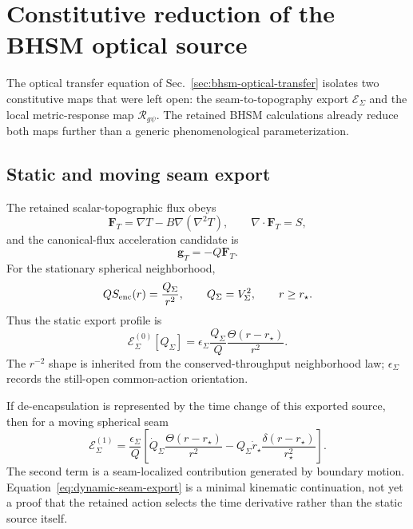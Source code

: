 \section{Constitutive reduction of the BHSM optical source}
\label{sec:bhsm-optical-constitutive}

The optical transfer equation of
Sec.~\ref{sec:bhsm-optical-transfer} isolates two constitutive maps that were
left open: the seam-to-topography export $\mathcal E_\Sigma$ and the local
metric-response map $\mathcal R_{g\psi}$.  The retained BHSM calculations
already reduce both maps further than a generic phenomenological
parameterization.

\subsection{Static and moving seam export}

The retained scalar-topographic flux obeys
\begin{equation}
\mathbf F_T=\nabla T-B\nabla(\nabla^2T),
\qquad
\nabla\cdot\mathbf F_T=S,
\end{equation}
and the canonical-flux acceleration candidate is
\begin{equation}
\mathbf g_T=-Q\mathbf F_T.
\end{equation}
For the stationary spherical neighborhood,
\begin{equation}
Q S_{\rm enc}(r)=\frac{Q_\Sigma}{r^2},
\qquad
Q_\Sigma=V_\Sigma^2,
\qquad
r\ge r_\star.
\end{equation}
Thus the static export profile is
\begin{equation}
\boxed{
\mathcal E_\Sigma^{(0)}[Q_\Sigma]
=
\epsilon_\Sigma
\frac{Q_\Sigma}{Q}
\frac{\Theta(r-r_\star)}{r^2}.
}
\label{eq:static-seam-export}
\end{equation}
The $r^{-2}$ shape is inherited from the conserved-throughput neighborhood
law; $\epsilon_\Sigma$ records the still-open common-action orientation.

If de-encapsulation is represented by the time change of this exported
source, then for a moving spherical seam
\begin{equation}
\boxed{
\mathcal E_\Sigma^{(1)}
=
\frac{\epsilon_\Sigma}{Q}
\left[
\dot Q_\Sigma\frac{\Theta(r-r_\star)}{r^2}
-
Q_\Sigma\dot r_\star
\frac{\delta(r-r_\star)}{r_\star^2}
\right].
}
\label{eq:dynamic-seam-export}
\end{equation}
The second term is a seam-localized contribution generated by boundary
motion.  Equation~\eqref{eq:dynamic-seam-export} is a minimal kinematic
continuation, not yet a proof that the retained action selects the time
derivative rather than the static source itself.

